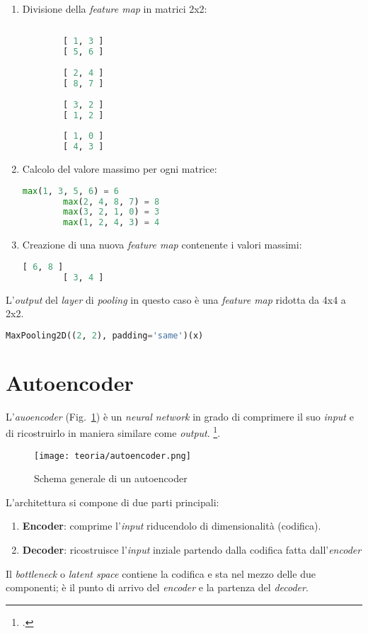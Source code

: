 \begin{enumerate}
    \item Divisione della \emph{feature map} in matrici 2x2:
    \begin{lstlisting}[language=Python, frame=none]
    
        [ 1, 3 ]
        [ 5, 6 ]
        
        [ 2, 4 ]
        [ 8, 7 ]
        
        [ 3, 2 ]
        [ 1, 2 ]
        
        [ 1, 0 ]
        [ 4, 3 ]

    \end{lstlisting}
    \item Calcolo del valore massimo per ogni matrice:
    
    \begin{lstlisting}[language=Python, frame=none]
        max(1, 3, 5, 6) = 6
        max(2, 4, 8, 7) = 8
        max(3, 2, 1, 0) = 3
        max(1, 2, 4, 3) = 4
    \end{lstlisting}

    \item Creazione di una nuova \emph{feature map} contenente i valori massimi:
    \begin{lstlisting}[language=Python, frame=none]
        [ 6, 8 ]
        [ 3, 4 ]
    \end{lstlisting}
\end{enumerate}
L'\emph{output} del \emph{layer} di \emph{pooling} in questo caso è una \emph{feature map} ridotta da 4x4 a 2x2.

\begin{lstlisting}[language=Python, frame=none]
    MaxPooling2D((2, 2), padding='same')(x)
\end{lstlisting}

\newpage

\section{Autoencoder}
L'\emph{auoencoder} (Fig.~\ref{fig:autoencoder-teoria}) è un \emph{neural network} in grado di comprimere il suo \emph{input} e di ricostruirlo in maniera similare come \emph{output}. \footcite[p.~499]{Goodfellow-et-al-2016}.

\begin{figure}[!h] 
    \centering 
    \texttt{[image: teoria/autoencoder.png]} 
    \caption{Schema generale di un autoencoder}
    \label{fig:autoencoder-teoria}
  \end{figure}
L'architettura si compone di due parti principali:
\begin{enumerate}
    \item \textbf{Encoder}: comprime l'\emph{input} riducendolo di dimensionalità (codifica).
    \item \textbf{Decoder}: ricostruisce l'\emph{input} inziale partendo dalla codifica fatta dall'\emph{encoder}
\end{enumerate}
Il \emph{bottleneck} o \emph{latent space} contiene la codifica e sta nel mezzo delle due componenti; è il punto di arrivo del \emph{encoder} e la partenza del \emph{decoder}.

